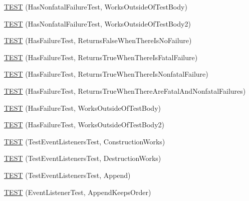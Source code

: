 \begin{DoxyCompactItemize}
\item 
\mbox{\hyperlink{googletest-master_2googletest_2test_2gtest__unittest_8cc_a97a31bbf9d4d1f7f36021db7efed056a}{T\+E\+ST}} (Has\+Nonfatal\+Failure\+Test, Works\+Outside\+Of\+Test\+Body)
\item 
\mbox{\hyperlink{googletest-master_2googletest_2test_2gtest__unittest_8cc_a1d352f5ce3c51840695c59733f8f642a}{T\+E\+ST}} (Has\+Nonfatal\+Failure\+Test, Works\+Outside\+Of\+Test\+Body2)
\item 
\mbox{\hyperlink{googletest-master_2googletest_2test_2gtest__unittest_8cc_a3963284acb609756dee763d91b93aaad}{T\+E\+ST}} (Has\+Failure\+Test, Returns\+False\+When\+There\+Is\+No\+Failure)
\item 
\mbox{\hyperlink{googletest-master_2googletest_2test_2gtest__unittest_8cc_a3226e1e613be7a832888a4a8f57fb02e}{T\+E\+ST}} (Has\+Failure\+Test, Returns\+True\+When\+There\+Is\+Fatal\+Failure)
\item 
\mbox{\hyperlink{googletest-master_2googletest_2test_2gtest__unittest_8cc_af4d5faf224cfe1acb3d49612a4659b3b}{T\+E\+ST}} (Has\+Failure\+Test, Returns\+True\+When\+There\+Is\+Nonfatal\+Failure)
\item 
\mbox{\hyperlink{googletest-master_2googletest_2test_2gtest__unittest_8cc_a80bc4f563ed06ee6b84f1370744fd3e6}{T\+E\+ST}} (Has\+Failure\+Test, Returns\+True\+When\+There\+Are\+Fatal\+And\+Nonfatal\+Failures)
\item 
\mbox{\hyperlink{googletest-master_2googletest_2test_2gtest__unittest_8cc_a4ff927d7677fcdff6fd6af7e27c6aab3}{T\+E\+ST}} (Has\+Failure\+Test, Works\+Outside\+Of\+Test\+Body)
\item 
\mbox{\hyperlink{googletest-master_2googletest_2test_2gtest__unittest_8cc_acb72846e1f7181d831d760128a763e08}{T\+E\+ST}} (Has\+Failure\+Test, Works\+Outside\+Of\+Test\+Body2)
\item 
\mbox{\hyperlink{googletest-master_2googletest_2test_2gtest__unittest_8cc_a7b39d7fb43a28e8098af85e3ee51eece}{T\+E\+ST}} (Test\+Event\+Listeners\+Test, Construction\+Works)
\item 
\mbox{\hyperlink{googletest-master_2googletest_2test_2gtest__unittest_8cc_a1d1592cafc34c09de7a810a7c4855162}{T\+E\+ST}} (Test\+Event\+Listeners\+Test, Destruction\+Works)
\item 
\mbox{\hyperlink{googletest-master_2googletest_2test_2gtest__unittest_8cc_a4b3f65b804787ed25c4136df142e1f77}{T\+E\+ST}} (Test\+Event\+Listeners\+Test, Append)
\item 
\mbox{\hyperlink{googletest-master_2googletest_2test_2gtest__unittest_8cc_a2a1ece611968f69f9feb86f639089511}{T\+E\+ST}} (Event\+Listener\+Test, Append\+Keeps\+Order)

\end{DoxyCompactItemize}
